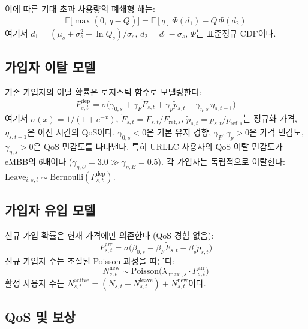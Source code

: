 \documentclass[10pt, twocolumn]{article}
\begin{document}
이에 따른 기대 초과 사용량의 폐쇄형 해는:
\begin{equation}
  \mathbb{E}\big[\max(0,\, q-\bar{Q})\big] = \mathbb{E}[q]\,\Phi(d_1) - \bar{Q}\,\Phi(d_2)
  \label{eq:overage}
\end{equation}
여기서 $d_1 = (\mu_s + \sigma_s^2 - \ln\bar{Q}_s)/\sigma_s$, $d_2 = d_1 - \sigma_s$, $\Phi$는 표준정규 CDF이다.

\subsection{가입자 이탈 모델}

기존 가입자의 이탈 확률은 로지스틱 함수로 모델링한다\cite{ahn2006, ribeiro2023}:
\begin{equation}
  P_{s,t}^{\text{dep}} = \sigma\!\Big(\gamma_{0,s} + \gamma_F \tilde{F}_{s,t} + \gamma_p \tilde{p}_{s,t} - \gamma_{\eta,s}\, \eta_{s,t-1}\Big)
  \label{eq:depart}
\end{equation}
여기서 $\sigma(x) = 1/(1+e^{-x})$, $\tilde{F}_{s,t} = F_{s,t}/F_{\text{ref},s}$, $\tilde{p}_{s,t} = p_{s,t}/p_{\text{ref},s}$는 정규화 가격, $\eta_{s,t-1}$은 이전 시간의 QoS이다.
$\gamma_{0,s} < 0$은 기본 유지 경향, $\gamma_F, \gamma_p > 0$은 가격 민감도, $\gamma_{\eta,s} > 0$은 QoS 민감도를 나타낸다.
특히 URLLC 사용자의 QoS 이탈 민감도가 eMBB의 6배이다 ($\gamma_{\eta,U} = 3.0 \gg \gamma_{\eta,E} = 0.5$).
각 가입자는 독립적으로 이탈한다: $\text{Leave}_{i,s,t} \sim \text{Bernoulli}(P_{s,t}^{\text{dep}})$.

\subsection{가입자 유입 모델}

신규 가입 확률은 현재 가격에만 의존한다\cite{chen2022} (QoS 경험 없음):
\begin{equation}
  P_{s,t}^{\text{arr}} = \sigma\!\Big(\beta_{0,s} - \beta_F \tilde{F}_{s,t} - \beta_p \tilde{p}_{s,t}\Big)
  \label{eq:arrive}
\end{equation}
신규 가입자 수는 조절된 Poisson 과정을 따른다:
\begin{equation}
  N_{s,t}^{\text{new}} \sim \text{Poisson}\!\big(\lambda_{\max,s} \cdot P_{s,t}^{\text{arr}}\big)
  \label{eq:poisson}
\end{equation}
활성 사용자 수는 $N_{s,t}^{\text{active}} = (N_{s,t} - N_{s,t}^{\text{leave}}) + N_{s,t}^{\text{new}}$이다.

\subsection{QoS 및 보상}
\end{document}
